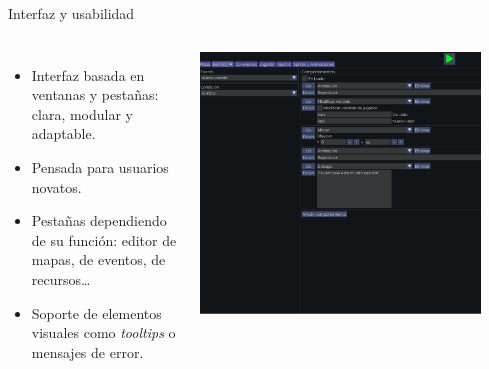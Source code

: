 \documentclass[aspectratio=169]{beamer}
\begin{document}
\begin{frame}{Interfaz y usabilidad}
	\begin{columns}
		 	\begin{itemize}
		 		\item Interfaz basada en ventanas y pestañas: clara, modular y adaptable.
		 		\item Pensada para usuarios novatos.
		 		\item Pestañas dependiendo de su función: editor de mapas, de eventos, de recursos\ldots
		 		\item Soporte de elementos visuales como \textit{tooltips} o mensajes de error.
		 	\end{itemize}
		 	\includegraphics[width=0.9\textwidth]{imgs/editor/eventos.pdf}
	\end{columns}
\end{frame}
\end{document}
